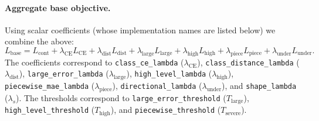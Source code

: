 \documentclass[11pt, a4paper]{article}
\begin{document}
\paragraph{Aggregate base objective.} Using scalar coefficients (whose implementation names are listed below) we combine the above:
\begin{equation}
L_{\mathrm{base}} = L_{\mathrm{cont}} + \lambda_{\mathrm{CE}} L_{\mathrm{CE}} + \lambda_{\mathrm{dist}} L_{\mathrm{dist}} + \lambda_{\mathrm{large}} L_{\mathrm{large}} + \lambda_{\mathrm{high}} L_{\mathrm{high}} + \lambda_{\mathrm{piece}} L_{\mathrm{piece}} + \lambda_{\mathrm{under}} L_{\mathrm{under}}.
\end{equation}
The coefficients correspond to \texttt{class\_ce\_lambda} ($\lambda_{\mathrm{CE}}$), \texttt{class\_distance\_lambda} ($\lambda_{\mathrm{dist}}$), \texttt{large\_error\_lambda} ($\lambda_{\mathrm{large}}$), \texttt{high\_level\_lambda} ($\lambda_{\mathrm{high}}$), \texttt{piecewise\_mae\_lambda} ($\lambda_{\mathrm{piece}}$), \texttt{directional\_lambda} ($\lambda_{\mathrm{under}}$), and \texttt{shape\_lambda} ($\lambda_s$). The thresholds correspond to \texttt{large\_error\_threshold} ($T_{\mathrm{large}}$), \texttt{high\_level\_threshold} ($T_{\mathrm{high}}$), and \texttt{piecewise\_threshold} ($T_{\mathrm{severe}}$).
\end{document}

